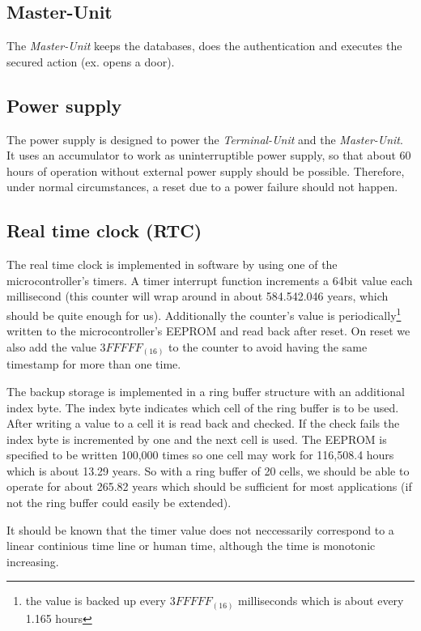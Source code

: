\subsection{Master-Unit}
The \textit{Master-Unit} keeps the databases, does the authentication and executes the secured action (ex. opens a door).

\subsection{Power supply}
The power supply is designed to power the \textit{Terminal-Unit} and the \textit{Master-Unit}. It uses an accumulator to work as uninterruptible power supply, so that about 60 hours of operation without external power supply should be possible. Therefore, under normal circumstances, a reset due to a power failure should not happen.

\subsection{Real time clock (RTC)}
The real time clock is implemented in software by using one of the microcontroller's timers. A timer interrupt function increments a 64bit value each millisecond (this counter will wrap around in about 584.542.046 years, which should be quite enough for us). Additionally the counter's value is periodically\footnote{the value is backed up every $3FFFFF_{(16)}$ milliseconds which is about every 1.165 hours} written to the microcontroller's EEPROM and read back after reset. On reset we also add the value $3FFFFF_{(16)}$ to the counter to avoid having the same timestamp for more than one time.

The backup storage is implemented in a ring buffer structure with an additional index byte. 
The index byte indicates which cell of the ring buffer is to be used. After writing a value to a cell it is read back and checked. If the check fails the index byte is incremented by one and the next cell is used. The EEPROM is specified to be written 100,000 times so one cell may work for 116,508.4 hours which is about 13.29 years. So with a ring buffer of 20 cells, we should be able to operate for about 265.82 years which should be sufficient for most applications (if not the ring buffer could easily be extended).

It should be known that the timer value does not neccessarily correspond to a linear continious time line or human time, although the time is monotonic increasing. %

